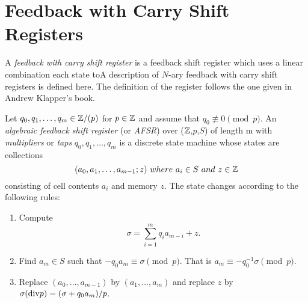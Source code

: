 \section{Feedback with Carry Shift Registers}

\par A {\em feedback with carry shift register} is a feedback shift register
which uses a linear combination each state toA description of $N$-ary feedback with
carry shift registers is defined here. The definition of the register follows the
one given in Andrew Klapper's book.

\begin{definition}\label{afsr}
  Let $q_0,q_1,\dots,q_m\in\mathbb{Z}/(p)$ for $p\in\mathbb{Z}$ and assume that
  $q_0\not\equiv0\pmod p$.
  An {\em algebraic feedback shift register} (or {\em AFSR}) over ($\mathbb{Z}$,$p$,$S$)
  of length m with {\em multipliers} or {\em taps} $q_0,q_1,\dots,q_m$ is a discrete
  state machine whose states are  collections
  \[
  (a_0,a_1,\dots,a_{m-1};z) \ where \ a_i\in S \ and \ z \in \zzz
  \]
  consisting of cell contents $a_i$ and memory $z$. The state changes according to
  the following rules:
  \begin{enumerate}[1.]
    \item Compute
      \[
      \sigma = \sum^m_{i=1}q_ia_{m-i}+z.
      \]
    \item Find $a_m\in S$ such that $-q_0a_m\equiv\sigma\pmod p$. That is
      $a_m\equiv-q_{0}^{-1}\sigma\pmod p$.
    \item Replace $(a_0,\dots,a_{m-1})$ by $(a_1,\dots,a_m)$ and replace $z$ by
      $\sigma({\rm div} p) = (\sigma+q_0a_m)/p$.
  \end{enumerate}
\end{definition}
